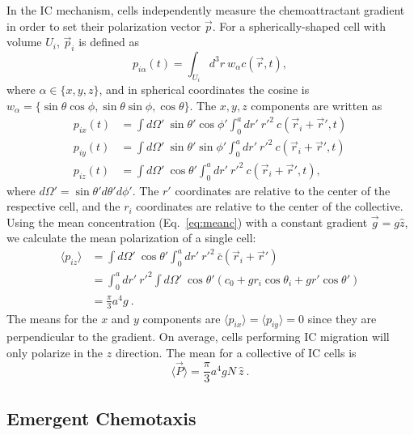 In the IC mechanism, cells independently measure the chemoattractant gradient in order to set their polarization vector $\vec{p}$. For a spherically-shaped cell with volume $U_i$, $\vec{p}_i$ is defined as
\begin{equation}
    p_{i\alpha}(t) = \int_{U_i} d^3r \ w_\alpha c(\vec{r},t) ,
\end{equation}
where $\alpha\in\{x,y,z\}$, and in spherical coordinates the cosine is $w_\alpha = \{\sin\theta \cos\phi, \sin\theta \sin\phi, \cos\theta\}$.
The $x, y, z$ components are written as
\begin{align}
    p_{ix}(t) &= \int d\Omega' \ \sin\theta' \cos\phi' \int_0^a dr' \ r'^2 \ c(\vec{r}_i+\vec{r}',t)  \label{eq:3DMWpx} \\
    p_{iy}(t) &= \int d\Omega' \ \sin\theta' \sin\phi' \int_0^a dr' \ r'^2 \ c(\vec{r}_i+\vec{r}',t)  \label{eq:3DMWpy} \\
    p_{iz}(t) &= \int d\Omega' \ \cos\theta' \int_0^a dr' \ r'^2 \ c(\vec{r}_i+\vec{r}',t), \label{eq:3DMWpz}
\end{align}
where $d\Omega' = \sin\theta'd\theta'd\phi'$. The $r'$ coordinates are relative to the center of the respective cell, and the $r_i$ coordinates are relative to the center of the collective.
Using the mean concentration (Eq.\ \ref{eq:meanc}) with a constant gradient $\vec{g} = g \hat{z}$, we calculate the mean polarization of a single cell:
\begin{align*}
    \langle p_{iz} \rangle &= \int d\Omega' \ \cos\theta' \int_0^a dr' \ r'^2 \ \bar{c}(\vec{r}_i+\vec{r}') \\
    &= \int_0^a dr' \ r'^2 \int d\Omega' \ \cos\theta' (c_0+gr_i\cos\theta_i+gr'\cos\theta') \\
    &= \frac{\pi}{3} a^4 g \ .
\end{align*}
The means for the $x$ and $y$ components are $\langle p_{ix} \rangle = \langle p_{iy} \rangle = 0$ since they are perpendicular to the gradient. On average, cells performing IC migration will only polarize in the $z$ direction. The mean for a collective of IC cells is
\begin{equation}
    \langle \vec{P} \rangle = \frac{\pi}{3} a^4 g N \ \hat{z} \ .
\end{equation}


\subsection{Emergent Chemotaxis}

